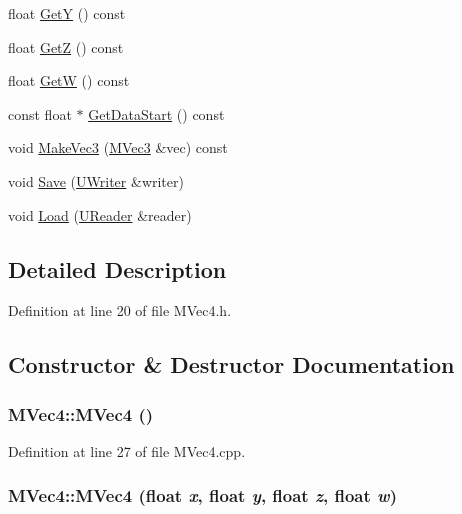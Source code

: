 \begin{CompactItemize}
\item 
float \hyperlink{class_m_vec4_1b2b8689c61873feecf0622252cb5dcc}{GetY} () const 
\item 
float \hyperlink{class_m_vec4_99ab5835f6f8d1ce2ed33532e646bd74}{GetZ} () const 
\item 
float \hyperlink{class_m_vec4_91b1c6b8b433967179c18355ef885d7b}{GetW} () const 
\item 
const float $\ast$ \hyperlink{class_m_vec4_bf21855162ebbca26c8464f7d0f84cf0}{GetDataStart} () const 
\item 
void \hyperlink{class_m_vec4_47d87a65186a68fe49dce64572bb0f77}{MakeVec3} (\hyperlink{class_m_vec3}{MVec3} \&vec) const 
\item 
void \hyperlink{class_m_vec4_e679677819d33edb08eba1da0a0d351c}{Save} (\hyperlink{class_u_writer}{UWriter} \&writer)
\item 
void \hyperlink{class_m_vec4_127235386d5e713c55e9ff7f9e0f2afc}{Load} (\hyperlink{class_u_reader}{UReader} \&reader)
\end{CompactItemize}


\subsection{Detailed Description}


Definition at line 20 of file MVec4.h.

\subsection{Constructor \& Destructor Documentation}
\hypertarget{class_m_vec4_8a5c04d8d382c02fc255e5810fc322dc}{
\subsubsection[{MVec4}]{\setlength{\rightskip}{0pt plus 5cm}MVec4::MVec4 ()}}
\label{class_m_vec4_8a5c04d8d382c02fc255e5810fc322dc}




Definition at line 27 of file MVec4.cpp.\hypertarget{class_m_vec4_f74c7ed14ca46995ad7d039233d29c10}{
\subsubsection[{MVec4}]{\setlength{\rightskip}{0pt plus 5cm}MVec4::MVec4 (float {\em x}, \/  float {\em y}, \/  float {\em z}, \/  float {\em w})}}
\label{class_m_vec4_f74c7ed14ca46995ad7d039233d29c10}




